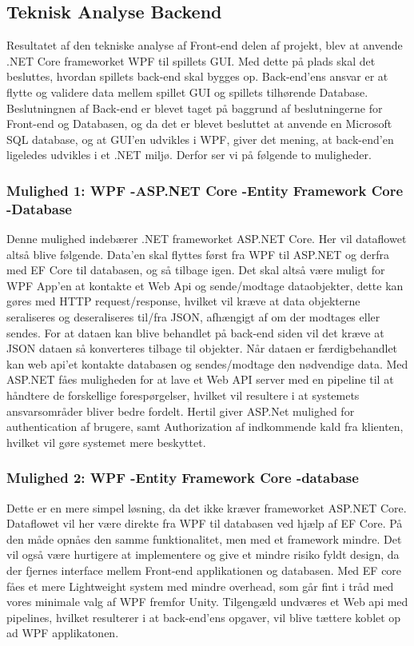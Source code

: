 \subsection{Teknisk Analyse Backend}
\label{ssec: Teknisk Analyse Backend}
Resultatet af den tekniske analyse af Front-end delen af projekt, blev at anvende .NET Core frameworket WPF til spillets GUI. Med dette på plads skal det besluttes, hvordan spillets back-end skal bygges op. Back-end’ens ansvar er at flytte og validere data mellem spillet GUI og spillets tilhørende Database. Beslutningnen af Back-end er blevet taget på baggrund af beslutningerne for Front-end og Databasen, og da det er blevet besluttet at anvende en Microsoft SQL database, og at GUI’en udvikles i WPF, giver det mening, at back-end’en ligeledes udvikles i et .NET miljø. Derfor ser vi på følgende to muligheder.\\


\subsubsection{Mulighed 1: WPF -\g ASP.NET Core -\g Entity Framework Core -\g Database}
Denne mulighed indebærer .NET frameworket ASP.NET Core. Her vil dataflowet altså blive følgende. Data’en skal flyttes først fra WPF til ASP.NET og derfra med EF Core til databasen, og så tilbage igen.
Det skal altså være muligt for WPF App’en at kontakte et Web Api og sende/modtage dataobjekter, dette kan gøres med HTTP request/response, hvilket vil kræve at data objekterne seraliseres og deseraliseres til/fra JSON, afhængigt af om der modtages eller sendes. For at dataen kan blive behandlet på back-end siden vil det kræve at JSON dataen så konverteres tilbage til objekter. Når dataen er færdigbehandlet kan web api’et kontakte databasen og sendes/modtage den nødvendige data. Med ASP.NET fåes muligheden for at lave et Web API server med en pipeline til at håndtere de forskellige forespørgelser, hvilket vil resultere i at systemets ansvarsområder bliver bedre fordelt. Hertil giver ASP.Net mulighed for authentication af brugere, samt Authorization af indkommende kald fra klienten, hvilket vil gøre systemet mere beskyttet. \\


\subsubsection{Mulighed 2: WPF -\g Entity Framework Core -\g database}

Dette er en mere simpel løsning, da det ikke kræver frameworket ASP.NET Core. Dataflowet vil her være direkte fra WPF til databasen ved hjælp af EF Core. På den måde opnåes den samme funktionalitet, men med et framework mindre. Det vil også være hurtigere at implementere og give et mindre risiko fyldt design, da der fjernes interface mellem Front-end applikationen og databasen. Med EF core fåes et mere Lightweight system med mindre overhead, som går fint i tråd med vores minimale valg af WPF fremfor Unity. Tilgengæld undværes et Web api med pipelines, hvilket resulterer i at back-end’ens opgaver, vil blive tættere koblet op ad WPF applikatonen.\\

